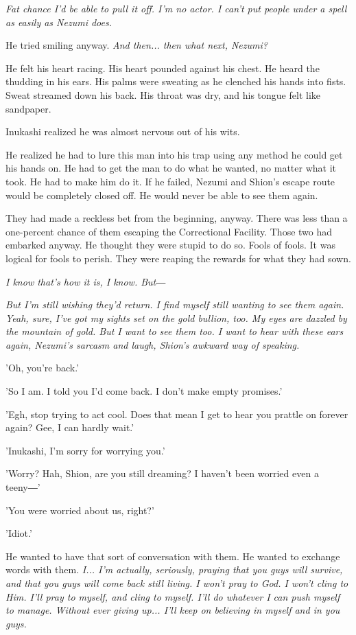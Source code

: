 \emph{Fat chance I'd be able to pull it off. I'm no actor. I can't put people
	under a spell as easily as Nezumi does.}

He tried smiling anyway. \emph{And then... then what next, Nezumi?}

He felt his heart racing. His heart pounded against his chest. He heard
the thudding in his ears. His palms were sweating as he clenched his
hands into fists. Sweat streamed down his back. His throat was dry, and
his tongue felt like sandpaper.

Inukashi realized he was almost nervous out of his wits.

He realized he had to lure this man into his trap using any method he
could get his hands on. He had to get the man to do what he wanted, no
matter what it took. He had to make him do it. If he failed, Nezumi and
Shion's escape route would be completely closed off. He would never be
able to see them again.

They had made a reckless bet from the beginning, anyway. There was less
than a one-percent chance of them escaping the Correctional Facility.
Those two had embarked anyway. He thought they were stupid to do so.
Fools of fools. It was logical for fools to perish. They were reaping
the rewards for what they had sown.

\emph{I know that's how it is, I know. But―}

\emph{But I'm still wishing they'd return. I find myself still wanting to see
	them again. Yeah, sure, I've got my sights set on the gold bullion, too.
	My eyes are dazzled by the mountain of gold. But I want to see them too.
	I want to hear with these ears again, Nezumi's sarcasm and laugh,
	Shion's awkward way of speaking.}

'Oh, you're back.'

'So I am. I told you I'd come back. I don't make empty promises.'

'Egh, stop trying to act cool. Does that mean I get to hear you prattle
on forever again? Gee, I can hardly wait.'

'Inukashi, I'm sorry for worrying you.'

'Worry? Hah, Shion, are you still dreaming? I haven't been worried even
a teeny―'

'You were worried about us, right?'

'Idiot.'

He wanted to have that sort of conversation with them. He wanted to
exchange words with them. \emph{I... I'm actually, seriously, praying that you
	guys will survive, and that you guys will come back still living. I
	won't pray to God. I won't cling to Him. I'll pray to myself, and cling
	to myself. I'll do whatever I can push myself to manage. Without ever
	giving up... I'll keep on believing in myself and in you guys.}

